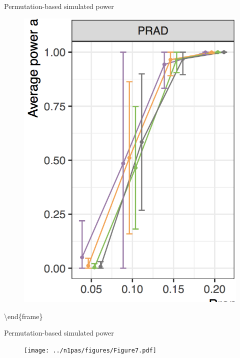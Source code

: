 \documentclass[ignorenonframetext,aspectratio=169,]{beamer}
\begin{document}
\begin{frame}{%
\protect\hypertarget{permutation-based-simulated-power}{%
Permutation-based simulated power}}

\begin{figure}[htb]
  \centering \includegraphics[keepaspectratio,width=\textwidth,height=0.9\textheight]{../n1pas/figures/Figure7_one.png}
\end{figure}

\textbackslash{}end\{frame\}

\end{frame}

\begin{frame}{%
\protect\hypertarget{permutation-based-simulated-power-1}{%
Permutation-based simulated power}}

\begin{figure}[htb]
  \centering \texttt{[image: ../n1pas/figures/Figure7.pdf]}
\end{figure}

\end{frame}
\end{document}
